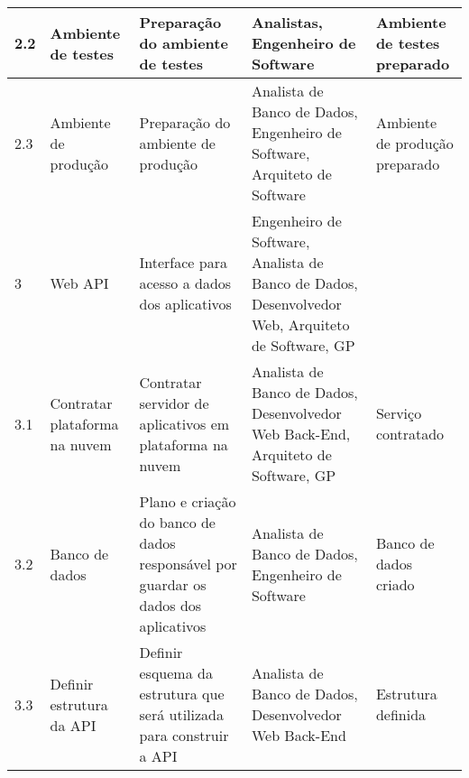\begin{landscape}
\begin{longtable}{@{\extracolsep{\fill}}  l  p{}  p{}  p{}  p{}  }
		\midrule
		2.2         & Ambiente de testes                                       & Preparação do ambiente de testes                                                                                                                                               & Analistas, Engenheiro de Software                                                                & Ambiente de testes preparado                                                                             \\*
		\midrule
		2.3         & Ambiente de produção                                   & Preparação do ambiente de produção                                                                                                                                           & Analista de Banco de Dados, Engenheiro de Software, Arquiteto de Software                        & Ambiente de produção preparado                                                                         \\*
		\midrule
		3           & Web API                                                  & Interface para acesso a dados dos aplicativos                                                                                                                                    & Engenheiro de Software, Analista de Banco de Dados, Desenvolvedor Web, Arquiteto de Software, GP &                                                                                                          \\*
		\midrule
		3.1         & Contratar plataforma na nuvem                            & Contratar servidor de aplicativos em plataforma na nuvem                                                                                                                         & Analista de Banco de Dados, Desenvolvedor Web Back-End, Arquiteto de Software, GP                & Serviço contratado                                                                                      \\*
		\midrule
		3.2         & Banco de dados                                           & Plano e criação do banco de dados responsável por guardar os dados dos aplicativos                                                                                            & Analista de Banco de Dados, Engenheiro de Software                                               & Banco de dados criado                                                                                    \\*
		\midrule
		3.3         & Definir estrutura da API                                 & Definir esquema da estrutura que será utilizada para construir a API                                                                                                            & Analista de Banco de Dados, Desenvolvedor Web Back-End                                           & Estrutura definida                                                                                       \\*

\end{longtable}
\end{landscape}
